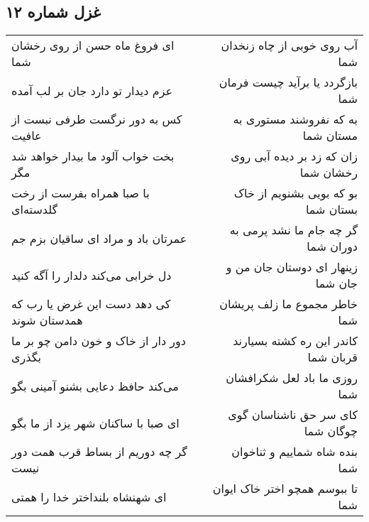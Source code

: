 \begin{center}
\section*{غزل شماره ۱۲}
\label{sec:sh012}
\begin{longtable}{l p{0.5cm} r}
ای فروغ ماه حسن از روی رخشان شما
&&
آب روی خوبی از چاه زنخدان شما
\\
عزم دیدار تو دارد جان بر لب آمده
&&
بازگردد یا برآید چیست فرمان شما
\\
کس به دور نرگست طرفی نبست از عافیت
&&
به که نفروشند مستوری به مستان شما
\\
بخت خواب آلود ما بیدار خواهد شد مگر
&&
زان که زد بر دیده آبی روی رخشان شما
\\
با صبا همراه بفرست از رخت گلدسته‌ای
&&
بو که بویی بشنویم از خاک بستان شما
\\
عمرتان باد و مراد ای ساقیان بزم جم
&&
گر چه جام ما نشد پرمی به دوران شما
\\
دل خرابی می‌کند دلدار را آگه کنید
&&
زینهار ای دوستان جان من و جان شما
\\
کی دهد دست این غرض یا رب که همدستان شوند
&&
خاطر مجموع ما زلف پریشان شما
\\
دور دار از خاک و خون دامن چو بر ما بگذری
&&
کاندر این ره کشته بسیارند قربان شما
\\
می‌کند حافظ دعایی بشنو آمینی بگو
&&
روزی ما باد لعل شکرافشان شما
\\
ای صبا با ساکنان شهر یزد از ما بگو
&&
کای سر حق ناشناسان گوی چوگان شما
\\
گر چه دوریم از بساط قرب همت دور نیست
&&
بنده شاه شماییم و ثناخوان شما
\\
ای شهنشاه بلنداختر خدا را همتی
&&
تا ببوسم همچو اختر خاک ایوان شما
\\
\end{longtable}
\end{center}

